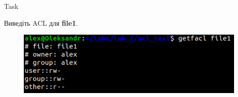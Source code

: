 \documentclass[a4paper,12pt]{article}
\newcommand{\RomanNumeralCaps}[1]{\MakeUppercase{\romannumeral #1}}
\begin{document}
    \begin{center}
        \Large{Task \RomanNumeralCaps{16}}
    \end{center}
    Виведіть ACL для \textbf{file1}.
    \begin{figure}[h!]
        \begin{minipage}[h]{1\linewidth}
            \centering
            \includegraphics[width=0.6\linewidth]{Prt sc/Figure_16.png}  
        \end{minipage}
    \end{figure}
    
\end{document}
